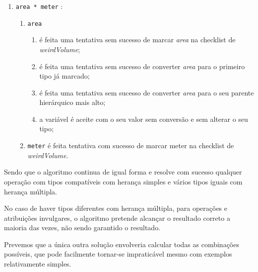 \documentclass{report}
\begin{document}
\begin{itemize}
\begin{enumerate}
    \item\texttt{area * meter} :
        \begin{enumerate}
            \item \texttt{area}
                \begin{enumerate}
                    \item é feita uma tentativa sem sucesso de marcar \textit{area} na checklist de \textit{weirdVolume};
                    \item é feita uma tentativa sem sucesso de converter \textit{area} para o primeiro tipo já marcado;
                    \item é feita uma tentativa sem sucesso de converter \textit{area} para o seu parente hierárquico mais alto;
                    \item a variável é aceite com o seu valor sem conversão e sem alterar o seu tipo;
                \end{enumerate}
            \item \texttt{meter} é feita tentativa com sucesso de marcar meter na checklist de \textit{weirdVolume}.
        \end{enumerate}
\end{enumerate}
Sendo que o algoritmo continua de igual forma e resolve com sucesso qualquer operação com tipos compatíveis com herança simples e vários tipos iguais com herança múltipla. 

No caso de haver tipos diferentes com herança múltipla, para operações e atribuições invulgares, o algoritmo pretende alcançar o resultado correto a maioria das vezes, não sendo garantido o resultado.

Prevemos que a única outra solução envolveria calcular todas as combinações possíveis, que pode facilmente tornar-se impraticável mesmo com exemplos relativamente simples.

\end{itemize}

               
\end{document}
